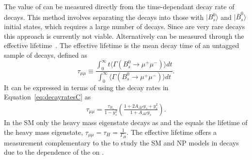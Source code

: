 The value of \ADG can be measured directly from the time-dependant decay rate of \bsmumu decays. This method involves separating the \bsmumu decays into those with $| B^0_s \rangle$ and $|\overline{B}^0_s\rangle$ initial states, which requires a large number of \bsmumu decays. Since \bsmumu are very rare decays this approach is currently not viable. Alternatively \ADG can be measured through the \bsmumu effective lifetime~\cite{DeBruyn:2012wj}. The effective lifetime is the mean decay time of an untagged sample of \bsmumu decays, defined as~\cite{Fleischer:2011cw}
\begin{equation}
  \tau_{\mu\mu} \equiv \frac{\int^{\infty}_0 t \langle \Gamma (B^0_s \to \mu^+ \mu^-) \rangle dt}{\int^{\infty}_0 \langle \Gamma (B^0_s \to\mu^+ \mu^-) \rangle dt}.
\label{eq:EL_def}
\end{equation}
It can be expressed in terms of \ADG using the decay rates in Equation~\ref{eq:decayratesC} as
\begin{align}
\tau_{\mu\mu} %
= \frac{\tau_{B_{s}}}{1 - y_{s}^{2}} \left ( \frac{ 1 + 2A_{\Delta\Gamma}y_{s} + y_{s}^{2}}{1 + A_{\Delta\Gamma}y_{s}} \right).
\label{eq:lifetimedef}
\end{align}
In the SM only the heavy \bs mass eigenstate decays as \bsmumu and the \el equals the lifetime of the heavy mass eigenstate, $\tau_{\mu\mu} = \tau_H = \frac{1}{\Gamma_H}$. The effective lifetime offers a measurement complementary to the \BFs to study the SM and NP models in \bsmumu decays due to the dependence of the \el on \ADG.


